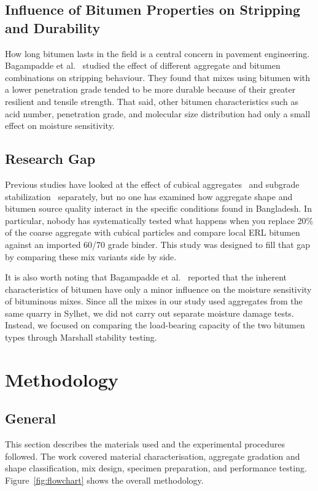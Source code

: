\documentclass[12pt,a4paper]{article}
\begin{document}
\subsection{Influence of Bitumen Properties on Stripping and Durability}
How long bitumen lasts in the field is a central concern in pavement engineering. Bagampadde et al.~\cite{bagampadde2006impact} studied the effect of different aggregate and bitumen combinations on stripping behaviour. They found that mixes using bitumen with a lower penetration grade tended to be more durable because of their greater resilient and tensile strength. That said, other bitumen characteristics such as acid number, penetration grade, and molecular size distribution had only a small effect on moisture sensitivity.

\subsection{Research Gap}
Previous studies have looked at the effect of cubical aggregates~\cite{teja2020effect, sumanth2017study} and subgrade stabilization~\cite{sood2015evaluation} separately, but no one has examined how aggregate shape and bitumen source quality interact in the specific conditions found in Bangladesh. In particular, nobody has systematically tested what happens when you replace 20\% of the coarse aggregate with cubical particles and compare local ERL bitumen against an imported 60/70 grade binder. This study was designed to fill that gap by comparing these mix variants side by side.

It is also worth noting that Bagampadde et al.~\cite{bagampadde2006impact} reported that the inherent characteristics of bitumen have only a minor influence on the moisture sensitivity of bituminous mixes. Since all the mixes in our study used aggregates from the same quarry in Sylhet, we did not carry out separate moisture damage tests. Instead, we focused on comparing the load-bearing capacity of the two bitumen types through Marshall stability testing.

\section{Methodology}

\subsection{General}

This section describes the materials used and the experimental procedures followed. The work covered material characterisation, aggregate gradation and shape classification, mix design, specimen preparation, and performance testing. Figure~\ref{fig:flowchart} shows the overall methodology.
\end{document}
